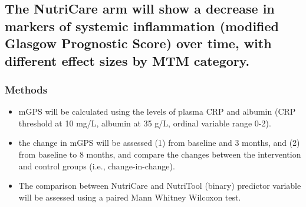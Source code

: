 \documentclass[]{article}
\providecommand{\tightlist}{%
  \setlength{\itemsep}{0pt}\setlength{\parskip}{0pt}}
\begin{document}
\hypertarget{the-nutricare-arm-will-show-a-decrease-in-markers-of-systemic-inflammation-modified-glasgow-prognostic-score-over-time-with-different-effect-sizes-by-mtm-category.}{%
\subsection{The NutriCare arm will show a decrease in markers of
systemic inflammation (modified Glasgow Prognostic Score) over time,
with different effect sizes by MTM
category.}\label{the-nutricare-arm-will-show-a-decrease-in-markers-of-systemic-inflammation-modified-glasgow-prognostic-score-over-time-with-different-effect-sizes-by-mtm-category.}}

\hypertarget{methods-1}{%
\subsubsection{Methods}\label{methods-1}}

\begin{itemize}
\tightlist
\item
  mGPS will be calculated using the levels of plasma CRP and albumin
  (CRP threshold at 10 mg/L, albumin at 35 g/L, ordinal variable range
  0-2).
\item
  the change in mGPS will be assessed (1) from baseline and 3 months,
  and (2) from baseline to 8 months, and compare the changes between the
  intervention and control groups (i.e., change-in-change).
\item
  The comparison between NutriCare and NutriTool (binary) predictor
  variable will be assessed using a paired Mann Whitney Wilcoxon test.
\end{itemize}
\end{document}
